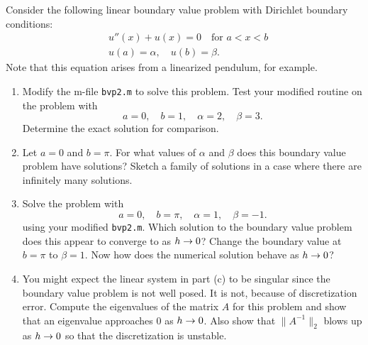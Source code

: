 

Consider the following linear boundary value problem
with Dirichlet boundary conditions:
\begin{equation*} 
\begin{split}
&u''(x) +  u(x) = 0 \quad \text{for $a< x< b$}\\
&u(a)=\alpha,\quad u(b)=\beta.
\end{split}
\end{equation*}
Note that this equation arises from a linearized pendulum, for example.

\begin{enumerate} 
\item
Modify the m-file {\tt bvp2.m} to solve this problem.  Test your modified
routine on the problem with
\[
a = 0, \quad b = 1, \quad \alpha = 2, \quad \beta = 3.
\]
Determine the exact solution for comparison.

\item 
Let $a=0$ and $b=\pi$. 
For what values of $\alpha$ and $\beta$  does this boundary value problem
have solutions?
Sketch a family of solutions in a case where there are infinitely many
solutions.

\item Solve the problem with 
\[
a = 0, \quad b = \pi, \quad \alpha = 1, \quad \beta = -1.
\]
using your modified {\tt bvp2.m}.  Which solution to the boundary value
problem does this appear to converge to as $h\rightarrow 0$?  Change the boundary
value at $b=\pi$ to $\beta = 1$.  Now how does the numerical solution behave
as $h\rightarrow 0$?

\item You might expect the linear system in part (c) to be singular since
the boundary value problem is not well posed.  It is not, because of
discretization error.  Compute the eigenvalues of the matrix $A$ for this
problem and show that an eigenvalue approaches 0 as $h\rightarrow 0$.
Also show that $\|A^{-1}\|_2$ blows up as $h\rightarrow 0$ so that the
discretization is unstable.

\end{enumerate} 
